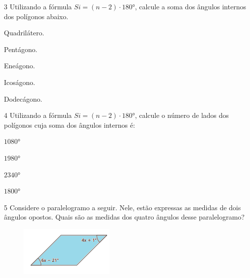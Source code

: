 \num{3} Utilizando a fórmula $Si = (n - 2) \cdot 180°$, calcule a soma dos ângulos
internos dos polígonos abaixo.

\begin{escolha}[itemsep=0pt]
\item Quadrilátero.
\item Pentágono.
\item Eneágono.
\item Icoságono.
\item Dodecágono.
\end{escolha}

\num{4} Utilizando a fórmula $Si = (n-2) \cdot 180°$, calcule o número de lados dos
polígonos cuja soma dos ângulos internos é:

\begin{escolha}[itemsep=0pt]
\item $1080°$
\item $1980°$
\item $2340°$
\item $1800°$
\end{escolha}



\num{5} Considere o paralelogramo a seguir. Nele, estão expressas as medidas
de dois ângulos opostos. Quais são as medidas dos quatro ângulos desse
paralelogramo?

\begin{figure}[H]
\centering\includegraphics[width=1.82292in,height=0.95833in]{./imgSAEB_8_MAT/media/image9.png}
\end{figure}

